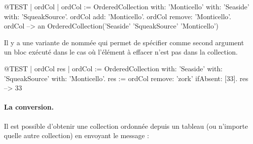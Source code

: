 \documentclass[a4paper,10pt,twoside]{book}
\begin{document}
\begin{code}{@TEST | ordCol | ordCol := OrderedCollection with: 'Monticello' with: 'Seaside' with: 'SqueakSource'.}
ordCol add: 'Monticello'.
ordCol remove: 'Monticello'.
ordCol --> an OrderedCollection('Seaside' 'SqueakSource' 'Monticello')
\end{code}

Il y a une variante de  nomm\'ee  qui permet de sp\'ecifier comme second argument un bloc ex\'ecut\'e dans le cas o\`u l'\'el\'ement \`a effacer n'est pas dans la collection. 

\begin{code}{@TEST | ordCol res | ordCol := OrderedCollection with: 'Seaside' with: 'SqueakSource' with: 'Monticello'.}
res := ordCol remove: 'zork' ifAbsent: [33].
res --> 33
\end{code}

\paragraph{La conversion.}
Il est possible d'obtenir une collection ordonn\'ee  depuis
un tableau  (ou n'importe quelle autre collection) en envoyant le message :




\end{document}
